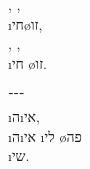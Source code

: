 , ,\\
\i{חי}\o{זו},\\
, ,\\
\i{חי} \o{זו}.

־־־\\
\i{ה}\i{אי},\\
\i{ה}\i{אי} \i{לי} \o{פה}\\
 \i{שי}.
